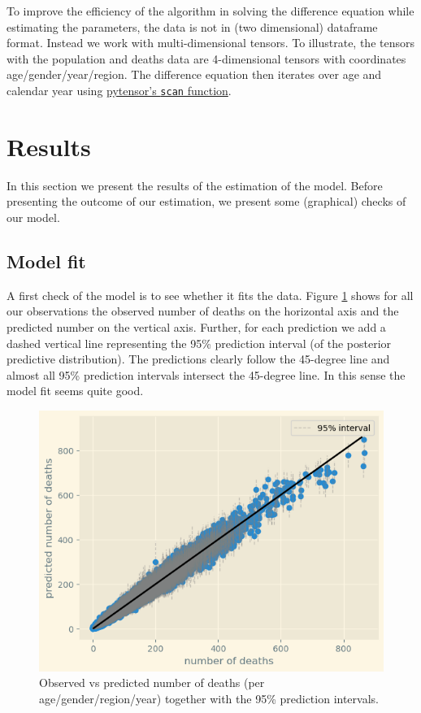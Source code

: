 \documentclass[a4paper,12pt]{article}
\begin{document}
To improve the efficiency of the algorithm in solving the difference equation while estimating the parameters, the data is not in (two dimensional) dataframe format. Instead we work with multi-dimensional tensors. To illustrate, the tensors with the population and deaths data are 4-dimensional tensors with coordinates age/gender/year/region. The difference equation then iterates over age and calendar year using \href{https://pytensor.readthedocs.io/en/latest/library/scan.html}{pytensor's \texttt{scan} function}.
\section{Results}
\label{sec:orgeffcdcc}

In this section we present the results of the estimation of the model. Before presenting the outcome of our estimation, we present some (graphical) checks of our model.
\subsection{Model fit}
\label{sec:org4cd9d7b}

A first check of the model is to see whether it fits the data. Figure \ref{fig:modelfit} shows for all our observations the observed number of deaths on the horizontal axis and the predicted number on the vertical axis. Further, for each prediction we add a dashed vertical line representing the 95\% prediction interval (of the posterior predictive distribution). The predictions clearly follow the 45-degree line and almost all 95\% prediction intervals intersect the 45-degree line. In this sense the model fit seems quite good.

\begin{figure}[htbp]
\centering
\includegraphics[width=.9\linewidth]{./figures/fit_model.png}
\caption{\label{fig:modelfit}Observed vs predicted number of deaths (per age/gender/region/year) together with the 95\% prediction intervals.}
\end{figure}
\end{document}
